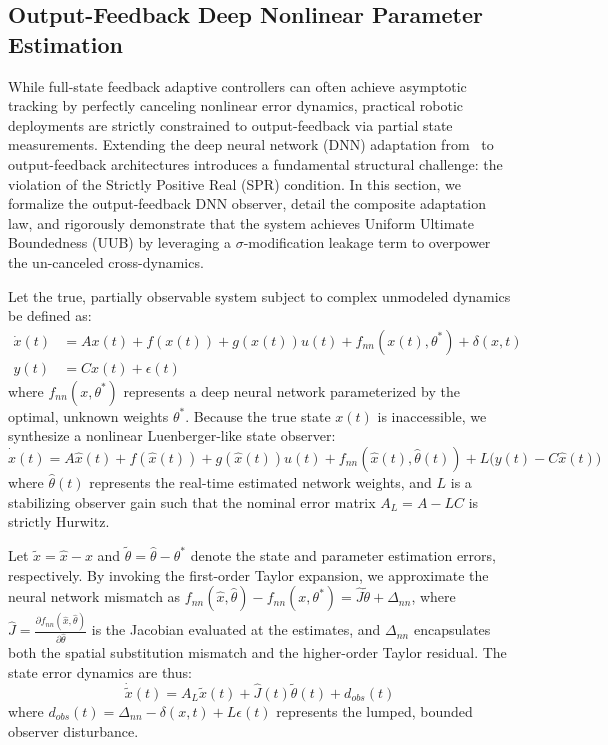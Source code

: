 \documentclass[letterpaper, 10 pt, conference]{ieeeconf}  %
\begin{document}
\subsection{Output-Feedback Deep Nonlinear Parameter Estimation}

While full-state feedback adaptive controllers can often achieve asymptotic tracking by perfectly canceling nonlinear error dynamics, practical robotic deployments are strictly constrained to output-feedback via partial state measurements. Extending the deep neural network (DNN) adaptation from~\cite{he2025self} to output-feedback architectures introduces a fundamental structural challenge: the violation of the Strictly Positive Real (SPR) condition. In this section, we formalize the output-feedback DNN observer, detail the composite adaptation law, and rigorously demonstrate that the system achieves Uniform Ultimate Boundedness (UUB) by leveraging a $\sigma$-modification leakage term to overpower the un-canceled cross-dynamics.

Let the true, partially observable system subject to complex unmodeled dynamics be defined as:
\begin{align}
    \dot{x}(t) &= A x(t) + f(x(t)) + g(x(t))u(t) + f_{nn}(x(t), \theta^*) + \delta(x, t) \\
    y(t) &= C x(t) + \epsilon(t)
\end{align}
where $f_{nn}(x, \theta^*)$ represents a deep neural network parameterized by the optimal, unknown weights $\theta^*$. Because the true state $x(t)$ is inaccessible, we synthesize a nonlinear Luenberger-like state observer:
\begin{equation}
    \dot{\hat{x}}(t) = A \hat{x}(t) + f(\hat{x}(t)) + g(\hat{x}(t))u(t) + f_{nn}(\hat{x}(t), \hat{\theta}(t)) + L \big( y(t) - C\hat{x}(t) \big)
\end{equation}
where $\hat{\theta}(t)$ represents the real-time estimated network weights, and $L$ is a stabilizing observer gain such that the nominal error matrix $A_L = A - LC$ is strictly Hurwitz.

Let $\tilde{x} = \hat{x} - x$ and $\tilde{\theta} = \hat{\theta} - \theta^*$ denote the state and parameter estimation errors, respectively. By invoking the first-order Taylor expansion, we approximate the neural network mismatch as $f_{nn}(\hat{x}, \hat{\theta}) - f_{nn}(x, \theta^*) = \hat{J}\tilde{\theta} + \Delta_{nn}$, where $\hat{J} = \frac{\partial f_{nn}(\hat{x}, \hat{\theta})}{\partial \hat{\theta}}$ is the Jacobian evaluated at the estimates, and $\Delta_{nn}$ encapsulates both the spatial substitution mismatch and the higher-order Taylor residual. The state error dynamics are thus:
\begin{equation}
    \dot{\tilde{x}}(t) = A_L \tilde{x}(t) + \hat{J}(t)\tilde{\theta}(t) + d_{obs}(t)
\end{equation}
where $d_{obs}(t) = \Delta_{nn} - \delta(x, t) + L\epsilon(t)$ represents the lumped, bounded observer disturbance.
\end{document}
